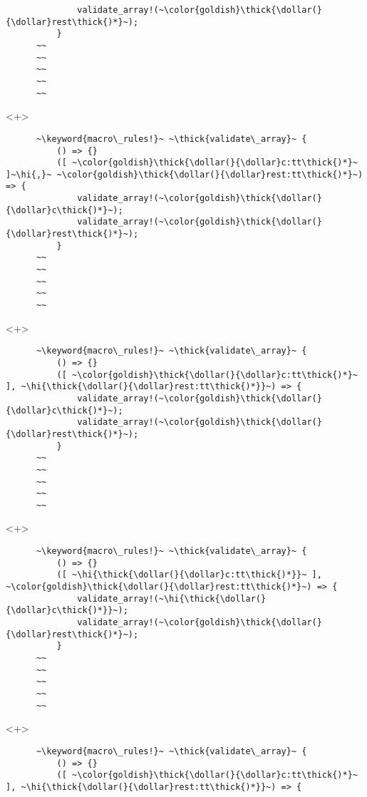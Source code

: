 \documentclass[usepdftitle=false,aspectratio=169]{beamer}
\newcommand{\dollar}{\makebox[\widthof{\$}][c]{\$}}
\newcommand{\thick}[1]{\contourlength{0.16pt}\contour[10]{black}{#1}}
\newcommand{\hi}[1]{%
\tikz[baseline=(A.base)]
 \node[highlighting=yellowbg,inner sep=0pt,text depth=0pt] (A) {#1};%
}
\newcommand{\keyword}[1]{\color{greenish}#1}
\begin{document}
\begin{frame}[fragile]
\begin{onlyenv}
\begin{verbatim}
              validate_array!(~\color{goldish}\thick{\dollar(}{\dollar}rest\thick{)*}~);
          }
      ~~
      ~~
      ~~
      ~~
      ~~
    \end{verbatim}
  \end{onlyenv}
  \begin{onlyenv}<+>
    \begin{verbatim}
      ~\keyword{macro\_rules!}~ ~\thick{validate\_array}~ {
          () => {}
          ([ ~\color{goldish}\thick{\dollar(}{\dollar}c:tt\thick{)*}~ ]~\hi{,}~ ~\color{goldish}\thick{\dollar(}{\dollar}rest:tt\thick{)*}~) => {
              validate_array!(~\color{goldish}\thick{\dollar(}{\dollar}c\thick{)*}~);
              validate_array!(~\color{goldish}\thick{\dollar(}{\dollar}rest\thick{)*}~);
          }
      ~~
      ~~
      ~~
      ~~
      ~~
    \end{verbatim}
  \end{onlyenv}
  \begin{onlyenv}<+>
    \begin{verbatim}
      ~\keyword{macro\_rules!}~ ~\thick{validate\_array}~ {
          () => {}
          ([ ~\color{goldish}\thick{\dollar(}{\dollar}c:tt\thick{)*}~ ], ~\hi{\thick{\dollar(}{\dollar}rest:tt\thick{)*}}~) => {
              validate_array!(~\color{goldish}\thick{\dollar(}{\dollar}c\thick{)*}~);
              validate_array!(~\color{goldish}\thick{\dollar(}{\dollar}rest\thick{)*}~);
          }
      ~~
      ~~
      ~~
      ~~
      ~~
    \end{verbatim}
  \end{onlyenv}
  \begin{onlyenv}<+>
    \begin{verbatim}
      ~\keyword{macro\_rules!}~ ~\thick{validate\_array}~ {
          () => {}
          ([ ~\hi{\thick{\dollar(}{\dollar}c:tt\thick{)*}}~ ], ~\color{goldish}\thick{\dollar(}{\dollar}rest:tt\thick{)*}~) => {
              validate_array!(~\hi{\thick{\dollar(}{\dollar}c\thick{)*}}~);
              validate_array!(~\color{goldish}\thick{\dollar(}{\dollar}rest\thick{)*}~);
          }
      ~~
      ~~
      ~~
      ~~
      ~~
    \end{verbatim}
  \end{onlyenv}
  \begin{onlyenv}<+>
    \begin{verbatim}
      ~\keyword{macro\_rules!}~ ~\thick{validate\_array}~ {
          () => {}
          ([ ~\color{goldish}\thick{\dollar(}{\dollar}c:tt\thick{)*}~ ], ~\hi{\thick{\dollar(}{\dollar}rest:tt\thick{)*}}~) => {

\end{verbatim}
\end{onlyenv}
\end{frame}
\end{document}
